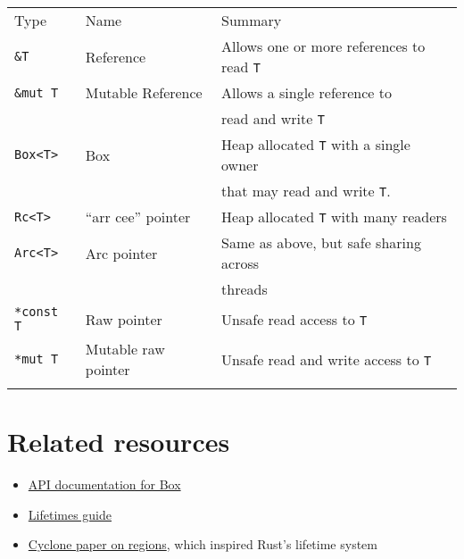 \documentclass[]{article}
\begin{document}
\begin{longtable}[c]{@{}lll@{}}
\toprule\addlinespace
Type & Name & Summary
\\\addlinespace
\midrule\endhead
\texttt{\&T} & Reference & Allows one or more references to read
\texttt{T}
\\\addlinespace
\texttt{\&mut T} & Mutable Reference & Allows a single reference to
\\\addlinespace
& & read and write \texttt{T}
\\\addlinespace
\texttt{Box\textless{}T\textgreater{}} & Box & Heap allocated \texttt{T}
with a single owner
\\\addlinespace
& & that may read and write \texttt{T}.
\\\addlinespace
\texttt{Rc\textless{}T\textgreater{}} & ``arr cee'' pointer & Heap
allocated \texttt{T} with many readers
\\\addlinespace
\texttt{Arc\textless{}T\textgreater{}} & Arc pointer & Same as above,
but safe sharing across
\\\addlinespace
& & threads
\\\addlinespace
\texttt{*const T} & Raw pointer & Unsafe read access to \texttt{T}
\\\addlinespace
\texttt{*mut T} & Mutable raw pointer & Unsafe read and write access to
\texttt{T}
\\\addlinespace
\bottomrule
\end{longtable}

\section{Related resources}\label{related-resources}

\begin{itemize}
\itemsep1pt\parskip0pt
\item
  \href{std/boxed/index.html}{API documentation for Box}
\item
  \href{guide-lifetimes.html}{Lifetimes guide}
\item
  \href{http://www.cs.umd.edu/projects/cyclone/papers/cyclone-regions.pdf}{Cyclone
  paper on regions}, which inspired Rust's lifetime system
\end{itemize}
\end{document}
